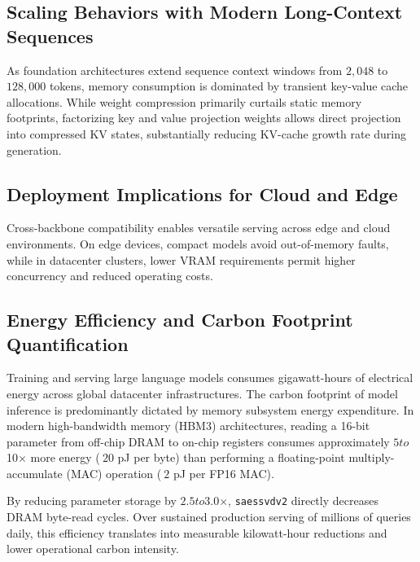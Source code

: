 \subsection{Scaling Behaviors with Modern Long-Context Sequences}
As foundation architectures extend sequence context windows from $2{,}048$ to $128{,}000$ tokens, memory consumption is dominated by transient key-value cache allocations. While weight compression primarily curtails static memory footprints, factorizing key and value projection weights allows direct projection into compressed KV states, substantially reducing KV-cache growth rate during generation.

\subsection{Deployment Implications for Cloud and Edge}
Cross-backbone compatibility enables versatile serving across edge and cloud environments. On edge devices, compact models avoid out-of-memory faults, while in datacenter clusters, lower VRAM requirements permit higher concurrency and reduced operating costs.

\subsection{Energy Efficiency and Carbon Footprint Quantification}
Training and serving large language models consumes gigawatt-hours of electrical energy across global datacenter infrastructures. The carbon footprint of model inference is predominantly dictated by memory subsystem energy expenditure. In modern high-bandwidth memory (HBM3) architectures, reading a 16-bit parameter from off-chip DRAM to on-chip registers consumes approximately $5$\times$ to $10$\times$ more energy ($~20$ pJ per byte) than performing a floating-point multiply-accumulate (MAC) operation ($~2$ pJ per FP16 MAC).

By reducing parameter storage by $2.5$\times$ to $3.0$\times$, \texttt{saessvdv2} directly decreases DRAM byte-read cycles. Over sustained production serving of millions of queries daily, this efficiency translates into measurable kilowatt-hour reductions and lower operational carbon intensity.
